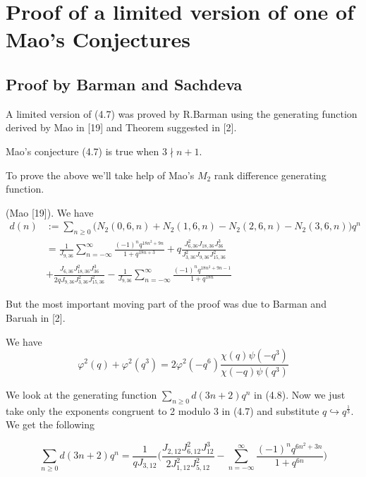 \newpage
\section{Proof of a limited version of one of Mao's Conjectures}

\subsection{Proof by Barman and Sachdeva}

A limited version of (4.7) was proved by R.Barman using the generating function derived by Mao in [19] and Theorem suggested in [2].

\begin{theorem}
Mao's conjecture (4.7) is true when $3 \nmid n+1$.
\end{theorem}
To prove the above we'll take help of Mao's $M_2$ rank difference generating function.
\begin{theorem}
(Mao [19]). We have 
\begin{equation}
    \begin{split}
        d(n) &:= \sum_{n\geq 0}\big(N_2(0,6,n) + N_2(1,6,n) - N_2(2,6,n) - N_2(3,6,n)\big)q^n \\
        &= \frac{1}{J_{9,36}}\sum_{n = -\infty}^\infty \frac{(-1)^nq^{18n^2 + 9n}}{1+q^{18n+3}} + q\frac{J_{6,36}^2J_{18,36}J_{36}^3}{J_{3,36}^2J_{9,36}J_{15,36}^2}\\
        &+ \frac{J_{6,36}J_{18,36}^2J_{36}^3}{2q J_{9,36}J_{3,36}^2J_{15,36}^2}-\frac{1}{J_{9,36}}\sum_{n = -\infty}^\infty\frac{(-1)^n q^{18n^2+9n-1} }{ 1+q^{18n} }
    \end{split}
\end{equation}
\end{theorem}

But the most important moving part of the proof was due to Barman and Baruah in [2].
\begin{theorem}
We have
\begin{equation}
    \varphi^2(q) + \varphi^2(q^3) = 2\varphi^2(-q^6)\frac{\chi(q)\psi(-q^3)}{\chi(-q)\psi(q^3)}
\end{equation}
\end{theorem}

We look at the generating function $\sum_{n \geq 0}d(3n+2)q^n$ in (4.8).
Now we just take only the exponents congruent to 2 modulo 3 in (4.7) and substitute $q \hookrightarrow q^{\frac{1}{3}}$. We get the following
\begin{proposition}
\begin{equation}
    \sum_{n \geq 0}d(3n+2)q^n  = \frac{1}{qJ_{3,12}}\bigg(\frac{J_{2,12}J_{6,12}^2J_{12}^3}{2J_{1,12}^2J_{5,12}^2} - \sum_{n = -\infty}^\infty \frac{(-1)^n q^{6n^2+3n} }{1+q^{6n} }\bigg)
\end{equation}
\end{proposition}

